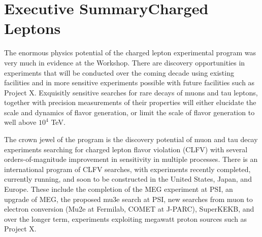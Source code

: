 \documentclass{tcibook}
\begin{document}
\def\bibname{References}


\raggedbottom


\parindent=0pt
\parskip=8pt
\setlength{\evensidemargin}{0pt}
\setlength{\oddsidemargin}{0pt}
\setlength{\marginparsep}{0.0in}
\setlength{\marginparwidth}{0.0in}
\marginparpush=0pt



\renewcommand{\chapname}{chap:intro_}
\renewcommand{\chapterdir}{.}
\renewcommand{\arraystretch}{1.25}
\addtolength{\arraycolsep}{-3pt}




\chapter{Executive Summary\break Charged Leptons}
\bigskip\bigskip
The enormous physics potential of the charged
lepton experimental program was very much in evidence at the Workshop. There are discovery opportunities in experiments that will be conducted over the coming decade using existing facilities and in more sensitive experiments possible with future facilities such as Project X.
Exquisitly sensitive searches for rare decays of muons and tau leptons, together with precision measurements of their properties will either elucidate the scale and dynamics of flavor generation, or
limit the scale of flavor generation to well above $10^4$ TeV.  

The crown jewel of the program is the discovery potential of muon and tau decay experiments searching for charged lepton flavor violation (CLFV) with several orders-of-magnitude improvement in sensitivity in
multiple processes.  There is an
international program of CLFV searches, with experiments recently completed, currently running, and
soon to be constructed in the United States, Japan, and Europe.  These include the completion of the MEG experiment at PSI, an upgrade of MEG,  the proposed mu3e search at PSI, new searches from muon to electron conversion (Mu2e at Fermilab, COMET at J-PARC), SuperKEKB, and over the longer term, experiments exploiting megawatt proton sources such as Project X.
\end{document}
